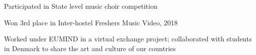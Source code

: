 
\begin{cventries}
	\vspace{-5.0mm}
	\cventry{}{}{}{}
	{
		\begin{cvitems}
			\item {Participated in State level music choir competition}
			\item {Won 3rd place in Inter-hostel Freshers Music Video, 2018}
			\item {Worked under EUMIND in a virtual exchange project; collaborated with students in Denmark to share the art and culture of our countries}
		\end{cvitems}
	}
\end{cventries}
